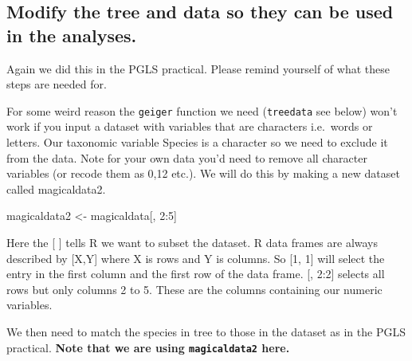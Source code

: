 \documentclass[]{book}
\newenvironment{Shaded}{\begin{snugshade}}{\end{snugshade}}
\newcommand{\KeywordTok}[1]{\textcolor[rgb]{0.13,0.29,0.53}{\textbf{{#1}}}}
\newcommand{\DecValTok}[1]{\textcolor[rgb]{0.00,0.00,0.81}{{#1}}}
\newcommand{\StringTok}[1]{\textcolor[rgb]{0.31,0.60,0.02}{{#1}}}
\newcommand{\CommentTok}[1]{\textcolor[rgb]{0.56,0.35,0.01}{\textit{{#1}}}}
\newcommand{\NormalTok}[1]{{#1}}
\begin{document}
\subsection{Modify the tree and data so they can be used in the
analyses.}\label{modify-the-tree-and-data-so-they-can-be-used-in-the-analyses.-1}

Again we did this in the PGLS practical. Please remind yourself of what
these steps are needed for.

\begin{Shaded}
\end{Shaded}

For some weird reason the \texttt{geiger} function we need
(\texttt{treedata} see below) won't work if you input a dataset with
variables that are characters i.e.~words or letters. Our taxonomic
variable Species is a character so we need to exclude it from the data.
Note for your own data you'd need to remove all character variables (or
recode them as 0,12 etc.). We will do this by making a new dataset
called magicaldata2.

\begin{Shaded}
\begin{Highlighting}[]
\NormalTok{magicaldata2 <-}\StringTok{ }\NormalTok{magicaldata[, }\DecValTok{2}\NormalTok{:}\DecValTok{5}\NormalTok{]}
\end{Highlighting}
\end{Shaded}

Here the {[} {]} tells R we want to subset the dataset. R data frames
are always described by {[}X,Y{]} where X is rows and Y is columns. So
{[}1, 1{]} will select the entry in the first column and the first row
of the data frame. {[}, 2:2{]} selects all rows but only columns 2 to 5.
These are the columns containing our numeric variables.

We then need to match the species in tree to those in the dataset as in
the PGLS practical. \textbf{Note that we are using \texttt{magicaldata2}
here.}
\end{document}
